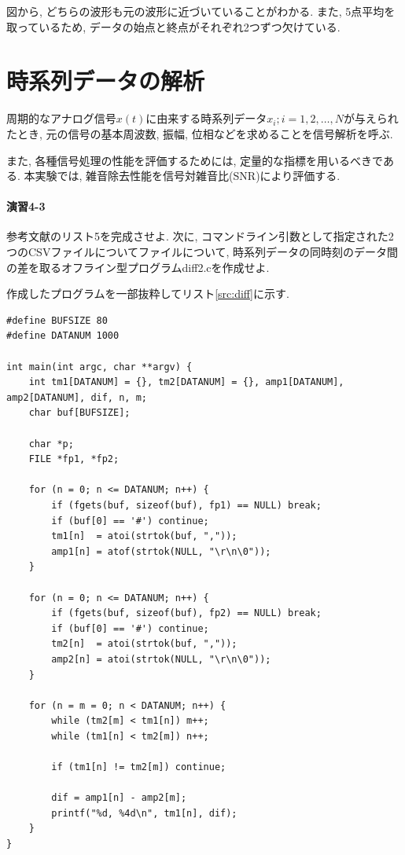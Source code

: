 \documentclass[titlepage]{jsarticle}
\begin{document}
        図から, どちらの波形も元の波形に近づいていることがわかる.
        また, 5点平均を取っているため, データの始点と終点がそれぞれ2つずつ欠けている.

\section{時系列データの解析}
    周期的なアナログ信号$x(t)$に由来する時系列データ$x_i;i=1,2,\dots,N$が与えられたとき,
    元の信号の基本周波数, 振幅, 位相などを求めることを信号解析を呼ぶ.
    
    また, 各種信号処理の性能を評価するためには, 定量的な指標を用いるべきである.
    本実験では, 雑音除去性能を信号対雑音比(SNR)により評価する.

    \paragraph{演習4-3} 参考文献\cite{Text}のリスト5を完成させよ.
    次に, コマンドライン引数として指定された2つのCSVファイルについてファイルについて,
    時系列データの同時刻のデータ間の差を取るオフライン型プログラムdiff2.cを作成せよ.

        作成したプログラムを一部抜粋してリスト\ref{src:diff}に示す.
        
        \begin{lstlisting}[caption=diff2.c, label=src:diff]
#define BUFSIZE 80
#define DATANUM 1000

int main(int argc, char **argv) {
    int tm1[DATANUM] = {}, tm2[DATANUM] = {}, amp1[DATANUM], amp2[DATANUM], dif, n, m;
    char buf[BUFSIZE];

    char *p;
    FILE *fp1, *fp2;

    for (n = 0; n <= DATANUM; n++) {
        if (fgets(buf, sizeof(buf), fp1) == NULL) break;
        if (buf[0] == '#') continue;
        tm1[n]  = atoi(strtok(buf, ","));
        amp1[n] = atof(strtok(NULL, "\r\n\0"));
    }

    for (n = 0; n <= DATANUM; n++) {
        if (fgets(buf, sizeof(buf), fp2) == NULL) break;
        if (buf[0] == '#') continue;
        tm2[n]  = atoi(strtok(buf, ","));
        amp2[n] = atoi(strtok(NULL, "\r\n\0"));
    }

    for (n = m = 0; n < DATANUM; n++) {
        while (tm2[m] < tm1[n]) m++;
        while (tm1[n] < tm2[m]) n++;

        if (tm1[n] != tm2[m]) continue;

        dif = amp1[n] - amp2[m];
        printf("%d, %4d\n", tm1[n], dif);
    }
}\end{lstlisting}
\end{document}

